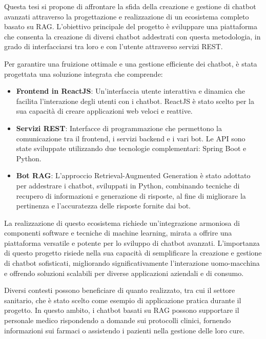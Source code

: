 \documentclass[a4paper,twoside,12pt]{toptesi}
\begin{document}
Questa tesi si propone di affrontare la sfida della creazione e gestione di chatbot avanzati attraverso la progettazione e realizzazione di un ecosistema completo basato su RAG. L’obiettivo principale del progetto è sviluppare una piattaforma che consenta la creazione di diversi chatbot addestrati con questa metodologia, in grado di interfacciarsi tra loro e con l’utente attraverso servizi REST.

Per garantire una fruizione ottimale e una gestione efficiente dei chatbot, è stata progettata una soluzione integrata che comprende:
\begin{itemize}
\item \textbf{Frontend in ReactJS}: Un'interfaccia utente interattiva e dinamica che facilita l'interazione degli utenti con i chatbot. ReactJS è stato scelto per la sua capacità di creare applicazioni web veloci e reattive.

\item \textbf{Servizi REST}: Interfacce di programmazione che permettono la comunicazione tra il frontend, i servizi backend e i vari bot. Le API sono state sviluppate utilizzando due tecnologie complementari: Spring Boot e Python.

\item \textbf{Bot RAG}: L'approccio Retrieval-Augmented Generation è stato adottato per addestrare i chatbot, sviluppati in Python, combinando tecniche di recupero di informazioni e generazione di risposte, al fine di migliorare la pertinenza e l'accuratezza delle risposte fornite dai bot.
\end{itemize}

La realizzazione di questo ecosistema richiede un'integrazione armoniosa di componenti software e tecniche di machine learning, mirata a offrire una piattaforma versatile e potente per lo sviluppo di chatbot avanzati. L'importanza di questo progetto risiede nella sua capacità di semplificare la creazione e gestione di chatbot sofisticati, migliorando significativamente l'interazione uomo-macchina e offrendo soluzioni scalabili per diverse applicazioni aziendali e di consumo.

Diversi contesti possono beneficiare di quanto realizzato, tra cui il settore sanitario, che è stato scelto come esempio di applicazione pratica durante il progetto. In questo ambito, i chatbot basati su RAG possono supportare il personale medico rispondendo a domande sui protocolli clinici, fornendo informazioni sui farmaci o assistendo i pazienti nella gestione delle loro cure.
\end{document}
